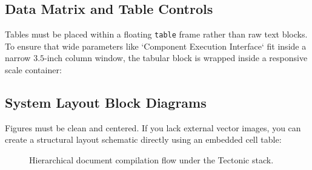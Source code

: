 \documentclass[10pt, journal, compsoc]{IEEEtran}
\begin{document}
\subsection{Data Matrix and Table Controls} \label{table:section}
Tables must be placed within a floating \texttt{table} frame rather than raw text blocks. To ensure that wide parameters like `Component Execution Interface` fit inside a narrow $3.5$-inch column window, the tabular block is wrapped inside a responsive scale container:

\begin{table}[h]
	\caption{Horizontal Bounding Box Fitment Test Matrix}
	\label{table:ieeemetrics}
	\centering
\end{table}

\subsection{System Layout Block Diagrams}
Figures must be clean and centered. If you lack external vector images, you can create a structural layout schematic directly using an embedded cell table:

\begin{figure}[h]
	\centering
	\caption{Hierarchical document compilation flow under the Tectonic stack.}
	\label{fig:ieee-flow}
\end{figure}
\end{document}

